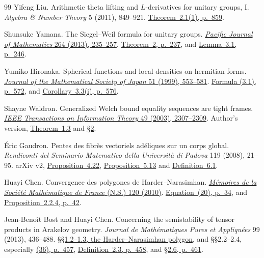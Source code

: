 \begin{thebibliography}{99}
Yifeng Liu.
Arithmetic theta lifting and \(L\)-derivatives for unitary groups, I.
\emph{Algebra \& Number Theory} 5 (2011), 849--921.
\href{https://msp.org/ant/2011/5-7/ant-v5-n7-p01-p.pdf\#page=12}
{Theorem~2.1(1), p.~859}.

Shunsuke Yamana.
The Siegel--Weil formula for unitary groups.
\href{https://doi.org/10.2140/pjm.2013.264.235}
{\emph{Pacific Journal of Mathematics} 264 (2013), 235--257}.
\href{https://msp.org/pjm/2013/264-1/pjm-v264-n1-p11-p.pdf\#page=4}
{Theorem~2, p.~237}, and
\href{https://msp.org/pjm/2013/264-1/pjm-v264-n1-p11-p.pdf\#page=13}
{Lemma~3.1, p.~246}.

Yumiko Hironaka.
Spherical functions and local densities on hermitian forms.
\href{https://doi.org/10.2969/jmsj/05130553}
{\emph{Journal of the Mathematical Society of Japan} 51 (1999), 553--581}.
\href{https://www.jstage.jst.go.jp/article/jmath1948/51/3/51_3_553/_pdf/-char/ja\#page=21}
{Formula (3.1), p.~572}, and
\href{https://www.jstage.jst.go.jp/article/jmath1948/51/3/51_3_553/_pdf/-char/ja\#page=25}
{Corollary~3.3(i), p.~576}.

Shayne Waldron.
Generalized Welch bound equality sequences are tight frames.
\href{https://doi.org/10.1109/TIT.2003.815788}
{\emph{IEEE Transactions on Information Theory} 49 (2003), 2307--2309}.
Author's version,
\href{https://www.math.auckland.ac.nz/~waldron/Preprints/Welch-bound/CLN-02-481.pdf\#page=2}
{Theorem~1.3} and
\href{https://www.math.auckland.ac.nz/~waldron/Preprints/Welch-bound/CLN-02-481.pdf\#page=3}
{\S2}.

\'Eric Gaudron.
Pentes des fibr\`es vectoriels ad\'eliques sur un corps global.
\emph{Rendiconti del Seminario Matematico della Universit\`a di Padova}
119 (2008), 21--95.
arXiv v2, \href{https://arxiv.org/pdf/math/0605408v2\#page=27}{Proposition~4.22},
\href{https://arxiv.org/pdf/math/0605408v2\#page=34}{Proposition~5.13} and
\href{https://arxiv.org/pdf/math/0605408v2\#page=38}{Definition~6.1}.

Huayi Chen.
Convergence des polygones de Harder--Narasimhan.
\href{https://doi.org/10.24033/msmf.432}
{\emph{M\'emoires de la Soci\'et\'e Math\'ematique de France} (N.S.) 120 (2010)}.
\href{https://www.numdam.org/item/10.24033/msmf.432.pdf\#page=36}
{Equation~(20), p.~34}, and
\href{https://www.numdam.org/item/10.24033/msmf.432.pdf\#page=44}
{Proposition~2.2.4, p.~42}.

Jean-Beno\^it Bost and Huayi Chen.
Concerning the semistability of tensor products in Arakelov geometry.
\emph{Journal de Math\'ematiques Pures et Appliqu\'ees} 99 (2013), 436--488.
\href{https://webusers.imj-prg.fr/~huayi.chen/Recherche/bost_chen.pdf\#page=3}
{\S\S1.2--1.3, the Harder--Narasimhan polygon}, and
\S\S2.2--2.4, especially
\href{https://webusers.imj-prg.fr/~huayi.chen/Recherche/bost_chen.pdf\#page=22}
{(36), p.~457},
\href{https://webusers.imj-prg.fr/~huayi.chen/Recherche/bost_chen.pdf\#page=23}
{Definition~2.3, p.~458}, and
\href{https://webusers.imj-prg.fr/~huayi.chen/Recherche/bost_chen.pdf\#page=26}
{\S2.6, p.~461}.


\end{thebibliography}
